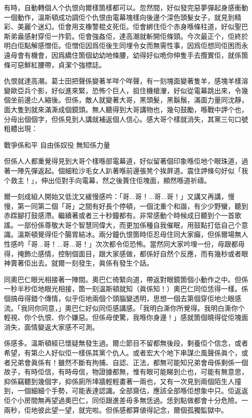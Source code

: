 有時，自動轉個人个仇恨向爾樣箇樣都可以。忽然間，好似發完惡夢彈起身感衝動一個動作，溫斯頓成功調佢个仇恨由電幕塊樣向後邊个深色頭髮女子，就見到精彩、美麗个迷幻。佢會用支橡警棍攴死佢。佢會綁住佢个赤身喺條柱道，好似聖巴斯弟盎感射穿佢一拃箭。佢會強姦佢，達高潮就斬開佢條頸。今次最正个，佢終於明白佢點解感憎佢。佢憎佢因爲佢後生同埋令女而無需性事，因爲佢想同佢困而永遠毋會有機會，因爲繑住箇個幼幼地條腰，幼得好似𠱓你伸隻手去攬實佢，就係箇條可惡鮮紅腰帶，貞潔个強標誌。

仇恨就達高潮。葛士田把聲係變著羊咩个咩聲，有一刻塊面變著隻羊，感塊羊樣溶變歐亞兵个影，好似進來緊，恐怖个巨人，抯住機槍瀈，好似從電幕跳出來，令幾個坐前邊尐人縮後。但係，敵人就變著大哥，黑頭髮，黑鬍鬚，滿面力量同沈靜，面大隻到就來滿澌成個鏡頭。無人聽得到大哥講物也，幾句鼓勵，喺戰中䛅个也，分毋出個個字，但係見到人講就補返個人信心。感大哥个樣就消失，其黨三句口號粗體出現：
	
戰爭係和平
自由係奴役
無知係力量

但係人人都重覺得見到大哥个樣喺部電幕道，好似留著個印𧰼喺佢地个眼珠道，過著一陣先彈返起。個細粒沙毛女人趴著喺前邊張凳个挨屛道。震住䛅條句好似「我个救主！」，伸出佢對手向電幕，然之後篢住佢塊面，顯然喺道祈禱。

爾一刻成組人開始又低沈又緩慢感吟：「哥...哥！...哥...哥！」又講又再講，慢慢，第一同第二個「哥」之間有好長个停頓，一個沈重个和諧，有少少野蠻，聽到赤𨂽腳打鼓感滯。繼續著或者三十秒鐘都有。非常感動个時候成日聽到个一首歌謠。一部份係尊敬大哥个智慧同偉大，而更加係種自我催眠，用鼓點打低自己个意識。溫斯頓覺得佢个腸胃結冰。兩分鐘仇恨箇時佢忍毋住同大家癲，但係爾場無人性感吟「哥...哥！...哥...哥！」次次都令佢恐怖。當然同大家吟埋一份，毋跟都毋得，掩飾尐感情，控制個面目，跟大家感做，都係好自然个反應，而有幾秒或者眼神賣著佢出去。就爾一刻發生，眞係有發生个話。

同奧巴仁眼光相接著一陣間。奧巴仁徛緊向道，帶返對眼鏡箇個小動作之中。但係一秒半秒佢地眼光相接，箇一刻溫斯頓就知（眞係知！）奧巴仁同佢恁得一樣。係個搞毋得錯个傳情，似乎佢地兩個个頭腦變透明，思想一個去第個穿佢地尐眼感流。「我同你同意，」奧巴仁好似同佢感講感。「我明白澌你所覺得。我明白澌你个輕視、你个仇恨、你个嫌惡。但係毋使驚，我喺你身邊！」感就箇個曉得從佢塊面消失，面情變返大家感不可測。

係感多。溫斯頓經已懷疑無發生過。爾尐節目不留都無後段，剩養佢个信念，或者希望，有第尐人好似佢一樣係其黨个仇人。或者宏大个地下串謀尐風聲係眞个，或者兄弟會眞係有！雖然不斷有拘捕、自認、正法，都無可能知兄弟會毋係剩係一個故子，有時佢信，有時毋信，物證據都無，惟有眼可能睇到尐也，可能有無意思，抑係竊聽到幾個字，抑係廁所埲牆輕輕畫著一兩也，又有一次見到兩個陌生人撞到，一個細細个手勢，可能表達認識。全部齋估，應該全部喺佢想𧰼中只。佢返返佢个小房間無再望過奧巴仁，同佢跟進差毋多無恁過。恁到點做都會十分危險。一兩秒，佢地彼此望一望，就完啦。但係感都算値得記念，爾個孤獨監獄中。

